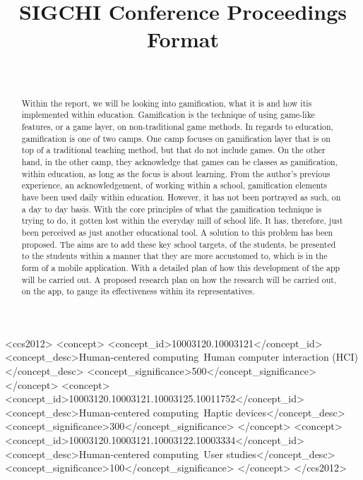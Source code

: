 \documentclass{sigchi}
\def\plaintitle{SIGCHI Conference Proceedings Format}
\begin{document}
\title{\plaintitle}

\author{%
  \\
}

\maketitle

\begin{abstract}
  Within the report, we will be looking into gamification, what it is and how itis implemented within education. Gamification is the technique of using game-like features, or a game layer, on non-traditional game methods. In regards to education,  gamification is one of two camps. One camp focuses on gamification layer that is on top of a traditional teaching method, but that do not include games.  On the other hand, in the other camp, they acknowledge that games can be classes as gamification, within education, as long as the focus is about learning. From the author's previous experience, an acknowledgement, of working within a school, gamification elements have been used daily within education. However, it has not been portrayed as such, on a day to day basis. With the core principles of what the gamification technique is trying to do, it gotten lost within the everyday mill of school life. It has, therefore, just been perceived as just another educational tool. A solution to this problem has been proposed. The aims are to add these key school targets, of the students, be presented to the students within a manner that they are more accustomed to, which is in the form of a mobile application. With a detailed plan of how this development of the app will be carried out. A proposed research plan on how the research will be carried out, on the app, to gauge its effectiveness within its representatives. 
\end{abstract}



\begin{CCSXML}
<ccs2012>
<concept>
<concept_id>10003120.10003121</concept_id>
<concept_desc>Human-centered computing~Human computer interaction (HCI)</concept_desc>
<concept_significance>500</concept_significance>
</concept>
<concept>
<concept_id>10003120.10003121.10003125.10011752</concept_id>
<concept_desc>Human-centered computing~Haptic devices</concept_desc>
<concept_significance>300</concept_significance>
</concept>
<concept>
<concept_id>10003120.10003121.10003122.10003334</concept_id>
<concept_desc>Human-centered computing~User studies</concept_desc>
<concept_significance>100</concept_significance>
</concept>
</ccs2012>
\end{CCSXML}
\end{document}
